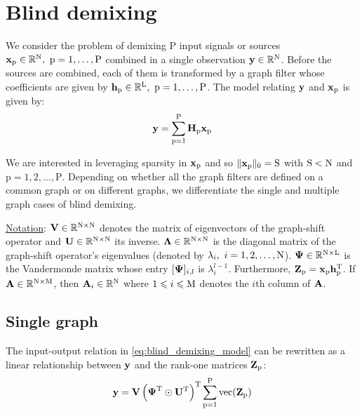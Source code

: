 \documentclass{article}
\newcommand{\numSources}{\text{P}}
\newcommand{\sourceIndex}{\text{p}}
\DeclareMathOperator{\vect}{vec}
\begin{document}
\section*{Blind demixing}

We consider the problem of demixing $\numSources$ input signals or sources $\bbx_{\sourceIndex} \in \mathbb{R}^{\rmN}, \ \sourceIndex=1,\ldots,\numSources$ combined in a single observation ${\mathbf y} \in \mathbb{R}^{{\text{N}}}$. Before the sources are combined, each of them is transformed by a graph filter whose coefficients are given by $\bbh_{\sourceIndex} \in \mathbb{R}^{\rmL}, \ \sourceIndex=1,\ldots,\numSources$. The model relating ${\mathbf y}$ and $\bbx_{\sourceIndex}$ is given by:
\begin{equation}
  \label{eq:blind_demixing_model}
  \bby = \sum_{\sourceIndex=1}^{\numSources} \bbH_{\sourceIndex} \bbx_{\sourceIndex}
\end{equation}

We are interested in leveraging sparsity in $\bbx_{\sourceIndex}$ and so $\|\bbx_{\sourceIndex}\|_{0}=\rmS$ with ${\text{S}} < {\text{N}}$ and $\sourceIndex=1,2,\ldots,\numSources$. Depending on whether all the graph filters are defined on a common graph or on different graphs, we differentiate the single and multiple graph cases of blind demixing.

\vspace{5mm}
\noindent
\underline{Notation}: ${\mathbf V} \in \mathbb{R}^{{\text{N}} \times {\ensuremath\text{N}}}$ denotes the matrix of eigenvectors of the graph-shift operator and ${\mathbf U} \in \mathbb{R}^{{\text{N}} \times {\ensuremath\text{N}}}$ its inverse. $\boldsymbol{\Lambda} \in \mathbb{R}^{{\text{N}} \times {\ensuremath\text{N}}}$ is the diagonal matrix of the graph-shift operator's eigenvalues (denoted by $\lambda_{i}, \ i=1,2,\ldots,\rmN$). $\boldsymbol{\Psi} \in \mathbb{R}^{{\text{N}} \times {\ensuremath\text{L}}}$ is the Vandermonde matrix whose entry $[\boldsymbol{\Psi}]_{i,l}$ is $\lambda_{i}^{l-1}$. Furthermore, $\bbZ_{\sourceIndex}=\bbx_{\sourceIndex} \bbh_{\sourceIndex}^{\rmT}$. If ${\mathbf A} \in \mathbb{R}^{{\text{N}} \times {\ensuremath\text{M}}}$, then ${\mathbf A}_{i} \in \mathbb{R}^{\text{N}}$ where $1 \leqslant i \leqslant {\ensuremath\text{M}}$ denotes the $i$th column of ${\mathbf A}$.

\subsection*{Single graph}

The input-output relation in \eqref{eq:blind_demixing_model} can be rewritten as a linear relationship between ${\mathbf y}$ and the rank-one matrices $\bbZ_{\sourceIndex}$:
\begin{equation}
  \label{eq:blind_demixing_sg_constraint}
  \bby = \bbV \left(\bbPsi^{\rmT} \odot \bbU^{\rmT} \right)^{\rmT}\sum_{\sourceIndex=1}^{\numSources} \vect(\bbZ_{\sourceIndex})
\end{equation}
\end{document}
